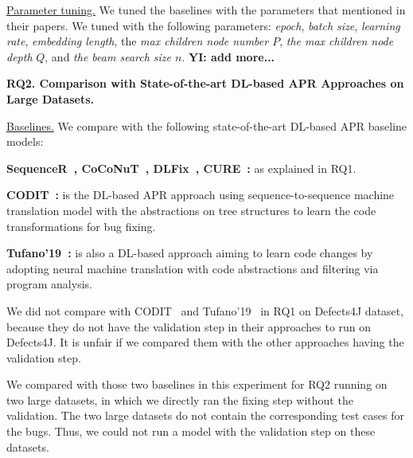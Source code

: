 \underline{Parameter tuning.} We tuned the baselines with the
parameters that mentioned in their papers. We tuned \tool with the
following parameters: {\em epoch}, {\em batch size}, {\em learning
  rate}, {\em embedding length}, the {\em max children node number
  $P$}, {\em the max children node depth} $Q$, and {\em the beam
  search size $n$}. {\bf YI: add more...}

{\bf RQ2. Comparison with State-of-the-art DL-based APR Approaches on
  Large Datasets.}

\underline{Baselines.} We compare {\tool} with the following state-of-the-art DL-based APR baseline models:

{\bf SequenceR~\cite{chen2018sequencer}, CoCoNuT~\cite{lutellier2020coconut}, DLFix~\cite{li2020dlfix}, CURE~\cite{cure-icse21}:} as explained in RQ1.

{\bf CODIT~\cite{chakrabortycodit}:} is the DL-based APR approach using
sequence-to-sequence machine translation model with the abstractions on tree
structures to learn the code transformations for bug fixing.

{\bf Tufano'19~\cite{tufano2019learning}:} is also a DL-based approach
aiming to learn code changes by adopting neural machine translation
with code abstractions and filtering via program analysis.

We did not compare with CODIT~\cite{chakrabortycodit} and
Tufano'19~\cite{tufano2019learning} in RQ1 on Defects4J dataset,
because they do not have the validation step in their approaches to
run on Defects4J. It is unfair if we compared them with the other
approaches having the validation step.

We compared {\tool} with those two baselines in this experiment for
RQ2 running on two large datasets, in which we directly ran the fixing
step without the validation. The two large datasets do not contain the
corresponding test cases for the bugs. Thus, we could not run a model
with the validation step on these datasets.



